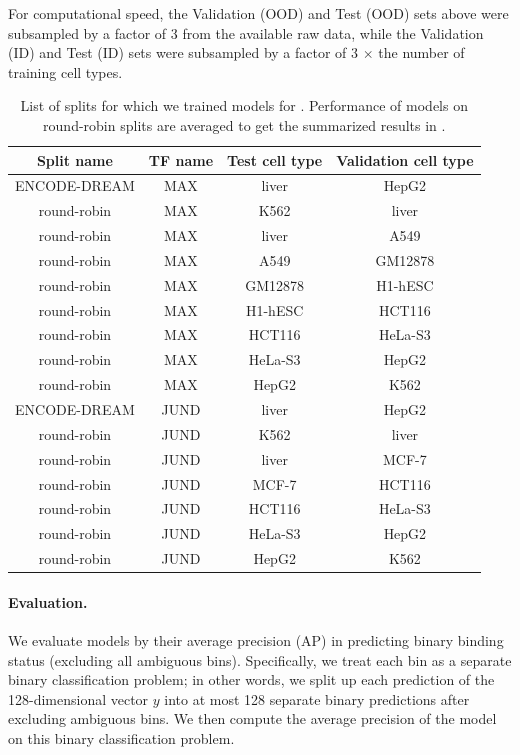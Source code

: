 For computational speed, the Validation (OOD) and Test (OOD) sets above were subsampled by a factor of 3 from the available raw data, while the Validation (ID) and Test (ID) sets were subsampled by a factor of 3 $\times$ the number of training cell types.


\begin{table}[t]
  \caption{
  List of splits for which we trained models for \Encode.
  Performance of models on round-robin splits are averaged to get the summarized results in .
  }
  \label{tab:splits}
  \begin{center}
  \begin{small}
  \begin{tabular}{cccc}
  \toprule
  Split name & TF name & Test cell type & Validation cell type  \\
  \midrule
  ENCODE-DREAM & MAX & liver &  HepG2  \\
  \midrule
  round-robin & MAX & K562  & liver  \\
  round-robin & MAX & liver & A549     \\
  round-robin & MAX & A549  & GM12878   \\
  round-robin & MAX & GM12878 &  H1-hESC  \\
  round-robin & MAX & H1-hESC  & HCT116  \\
  round-robin & MAX & HCT116  & HeLa-S3  \\
  round-robin & MAX & HeLa-S3 &  HepG2  \\
  round-robin & MAX & HepG2  & K562 \\
  \midrule
  ENCODE-DREAM & JUND & liver &  HepG2  \\
  \midrule
  round-robin & JUND & K562 &  liver  \\
  round-robin & JUND & liver &  MCF-7   \\
  round-robin & JUND & MCF-7 & HCT116  \\
  round-robin & JUND & HCT116  & HeLa-S3   \\
  round-robin & JUND & HeLa-S3  & HepG2  \\
  round-robin & JUND & HepG2  & K562  \\
  \bottomrule
  \end{tabular}
  \end{small}
  \end{center}
  \vspace{-4mm}
\end{table}


\paragraph{Evaluation.}
We evaluate models by their average precision (AP) in predicting binary binding status (excluding all ambiguous bins). Specifically, we treat each bin as a separate binary classification problem; in other words, we split up each prediction of the 128-dimensional vector $y$ into at most 128 separate binary predictions after excluding ambiguous bins. We then compute the average precision of the model on this binary classification problem.

